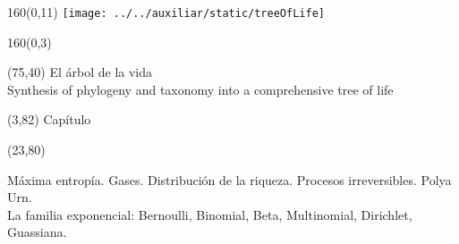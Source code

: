 \documentclass[shownotes,aspectratio=169]{beamer}
\newcounter{capitulo}
\newcommand{\unidad}{\thecapitulo \stepcounter{capitulo}}
\begin{document}
\begin{frame}

\begin{textblock}{160}(0,11)  \centering
\texttt{[image: ../../auxiliar/static/treeOfLife]}
\end{textblock}

\begin{textblock}{160}(0,3) \centering
\LARGE \textcolor{black!85}{}
\end{textblock}



\begin{textblock}{55}(75,40)
\textcolor{black!85}{\small El árbol de la vida \\
\fontsize{2}{0}\selectfont Synthesis of phylogeny and taxonomy into a comprehensive tree of life \\}
\end{textblock}


\begin{textblock}{55}(3,82)
\textcolor{black!85}{Capítulo \unidad}
\end{textblock}

\begin{textblock}{55}(23,80)
\begin{turn}{0}
\parbox{15cm}{\small \textcolor{black!85}{Máxima entropía. Gases. Distribución de la riqueza. Procesos irreversibles. Polya Urn.   \\
La familia exponencial: Bernoulli, Binomial, Beta, Multinomial, Dirichlet, Guassiana.} \\
}
\end{turn}
\end{textblock}

\end{frame}
\end{document}
